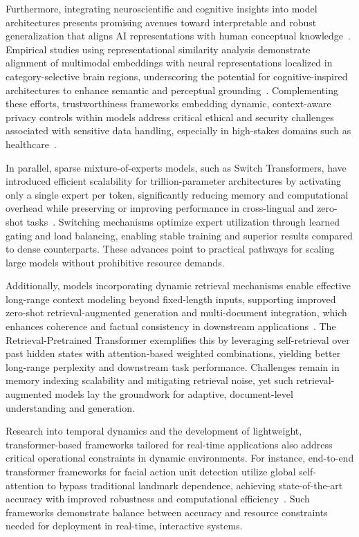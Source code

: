 \documentclass[sigconf]{acmart}
\begin{document}
Furthermore, integrating neuroscientific and cognitive insights into model architectures presents promising avenues toward interpretable and robust generalization that aligns AI representations with human conceptual knowledge~\cite{ref2,ref4,ref5,ref11,ref14}. Empirical studies using representational similarity analysis demonstrate alignment of multimodal embeddings with neural representations localized in category-selective brain regions, underscoring the potential for cognitive-inspired architectures to enhance semantic and perceptual grounding~\cite{ref2}. Complementing these efforts, trustworthiness frameworks embedding dynamic, context-aware privacy controls within models address critical ethical and security challenges associated with sensitive data handling, especially in high-stakes domains such as healthcare~\cite{ref11}.

In parallel, sparse mixture-of-experts models, such as Switch Transformers, have introduced efficient scalability for trillion-parameter architectures by activating only a single expert per token, significantly reducing memory and computational overhead while preserving or improving performance in cross-lingual and zero-shot tasks~\cite{ref14}. Switching mechanisms optimize expert utilization through learned gating and load balancing, enabling stable training and superior results compared to dense counterparts. These advances point to practical pathways for scaling large models without prohibitive resource demands.

Additionally, models incorporating dynamic retrieval mechanisms enable effective long-range context modeling beyond fixed-length inputs, supporting improved zero-shot retrieval-augmented generation and multi-document integration, which enhances coherence and factual consistency in downstream applications~\cite{ref29}. The Retrieval-Pretrained Transformer exemplifies this by leveraging self-retrieval over past hidden states with attention-based weighted combinations, yielding better long-range perplexity and downstream task performance. Challenges remain in memory indexing scalability and mitigating retrieval noise, yet such retrieval-augmented models lay the groundwork for adaptive, document-level understanding and generation.

Research into temporal dynamics and the development of lightweight, transformer-based frameworks tailored for real-time applications also address critical operational constraints in dynamic environments. For instance, end-to-end transformer frameworks for facial action unit detection utilize global self-attention to bypass traditional landmark dependence, achieving state-of-the-art accuracy with improved robustness and computational efficiency~\cite{ref18}. Such frameworks demonstrate balance between accuracy and resource constraints needed for deployment in real-time, interactive systems.
\end{document}
